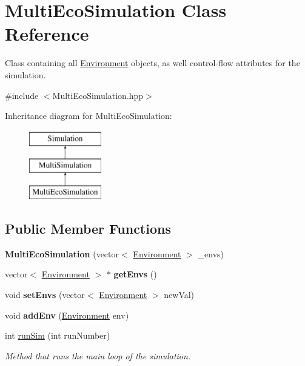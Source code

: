 \hypertarget{classMultiEcoSimulation}{}\section{Multi\+Eco\+Simulation Class Reference}
\label{classMultiEcoSimulation}


Class containing all \hyperlink{classEnvironment}{Environment} objects, as well control-\/flow attributes for the simulation.  




{\ttfamily \#include $<$Multi\+Eco\+Simulation.\+hpp$>$}

Inheritance diagram for Multi\+Eco\+Simulation\+:\begin{figure}[H]
\begin{center}
\leavevmode
\includegraphics[height=3.000000cm]{classMultiEcoSimulation}
\end{center}
\end{figure}
\subsection*{Public Member Functions}
\begin{DoxyCompactItemize}
\item 
\hypertarget{classMultiEcoSimulation_af8a850bdfb77405c1e93b1f6549e36d8}{}\label{classMultiEcoSimulation_af8a850bdfb77405c1e93b1f6549e36d8} 
{\bfseries Multi\+Eco\+Simulation} (vector$<$ \hyperlink{classEnvironment}{Environment} $>$ \+\_\+envs)
\item 
\hypertarget{classMultiEcoSimulation_a6bff1bcc1a05b2fdabfd3885ad62022f}{}\label{classMultiEcoSimulation_a6bff1bcc1a05b2fdabfd3885ad62022f} 
vector$<$ \hyperlink{classEnvironment}{Environment} $>$ $\ast$ {\bfseries get\+Envs} ()
\item 
\hypertarget{classMultiEcoSimulation_a94ebc91936e91b516d4bd442b80a472e}{}\label{classMultiEcoSimulation_a94ebc91936e91b516d4bd442b80a472e} 
void {\bfseries set\+Envs} (vector$<$ \hyperlink{classEnvironment}{Environment} $>$ new\+Val)
\item 
\hypertarget{classMultiEcoSimulation_ae8dd59a797f43d0fffd34ec3cdc06728}{}\label{classMultiEcoSimulation_ae8dd59a797f43d0fffd34ec3cdc06728} 
void {\bfseries add\+Env} (\hyperlink{classEnvironment}{Environment} env)
\item 
int \hyperlink{classMultiEcoSimulation_ad490e089c083d06d80c62af9e1564ac3}{run\+Sim} (int run\+Number)
\begin{DoxyCompactList}\small\item\em Method that runs the main loop of the simulation. \end{DoxyCompactList}\end{DoxyCompactItemize}
